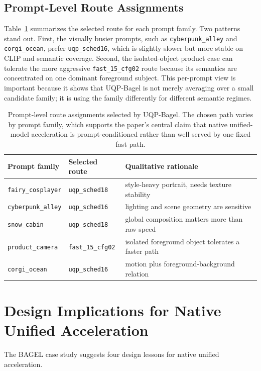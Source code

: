 \documentclass{article}
\begin{document}
\subsection{Prompt-Level Route Assignments}
Table~\ref{tab:prompt-routes} summarizes the selected route for each prompt family. Two patterns stand out. First, the visually busier prompts, such as \texttt{cyberpunk\_alley} and \texttt{corgi\_ocean}, prefer \texttt{uqp\_sched16}, which is slightly slower but more stable on CLIP and semantic coverage. Second, the isolated-object product case can tolerate the more aggressive \texttt{fast\_15\_cfg02} route because its semantics are concentrated on one dominant foreground subject. This per-prompt view is important because it shows that UQP-Bagel is not merely averaging over a small candidate family; it is using the family differently for different semantic regimes.

\begin{table}[t]
\caption{Prompt-level route assignments selected by UQP-Bagel. The chosen path varies by prompt family, which supports the paper's central claim that native unified-model acceleration is prompt-conditioned rather than well served by one fixed fast path.}
\label{tab:prompt-routes}
\centering
\small
\begin{tabular}{lll}
\toprule
Prompt family & Selected route & Qualitative rationale \\
\midrule
\texttt{fairy\_cosplayer} & \texttt{uqp\_sched18} & style-heavy portrait, needs texture stability \\
\texttt{cyberpunk\_alley} & \texttt{uqp\_sched16} & lighting and scene geometry are sensitive \\
\texttt{snow\_cabin} & \texttt{uqp\_sched18} & global composition matters more than raw speed \\
\texttt{product\_camera} & \texttt{fast\_15\_cfg02} & isolated foreground object tolerates a faster path \\
\texttt{corgi\_ocean} & \texttt{uqp\_sched16} & motion plus foreground-background relation \\
\bottomrule
\end{tabular}
\end{table}

\section{Design Implications for Native Unified Acceleration}
The BAGEL case study suggests four design lessons for native unified acceleration.
\end{document}
